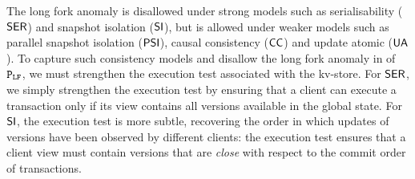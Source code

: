 The long fork anomaly is disallowed under strong models 
such as serialisability (\(\mathsf{SER}\)) and snapshot isolation (\(\mathsf{SI}\)), 
but is allowed under weaker models such as parallel snapshot isolation (\(\mathsf{PSI}\)), causal consistency (\(\mathsf{CC}\)) and update atomic (\( \mathsf{UA} \)).
To capture such consistency models and disallow the long fork anomaly in
of \(\mathtt{P}_{\mathtt{LF}}\), we must strengthen the execution test associated with the kv-store.
For \(\mathsf{SER}\), we simply strengthen the execution test by ensuring that a client can execute a transaction 
only if its view contains all versions available in the global state.
For \(\mathsf{SI}\), the execution test is more subtle, recovering the order in which 
updates of versions have been observed by different clients:
the execution test ensures that a client view must contain versions 
that are \emph{close} with respect to the commit order of transactions.
